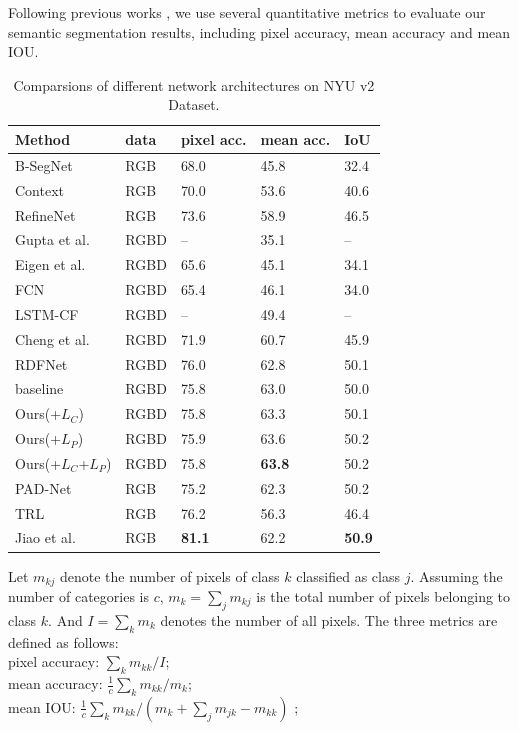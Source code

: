 Following previous works
\cite{Eigen2015,Gupta2014,Kendall2015,Lin2016,Lin2017,Li2016,Cheng2017,Park2017,Xu2018,Zhang2018,Jiao2018}, we use several quantitative metrics to evaluate our semantic segmentation results, including pixel 
accuracy, mean accuracy and mean IOU. 
%
\begin{table}[!htbp]
	\vspace{-0.4cm}
	\centering
	\caption{Comparsions of different network architectures on NYU v2 Dataset.}
	\begin{tabular*}{8.7cm}{lllll}
		\hline
		Method & data & pixel acc. & mean acc. & IoU\\
		\hline \hline
		B-SegNet \cite{Kendall2015} & RGB &68.0 & 45.8 & 32.4 \\
		Context \cite{Lin2016} & RGB & 70.0 & 53.6 & 40.6 \\
		RefineNet \cite{Lin2017} & RGB & 73.6 & 58.9 & 46.5\\
		\hline
		Gupta et al. \cite{Gupta2014} & RGBD & -- & 35.1 &--\\
		Eigen et al. \cite{Eigen2015} & RGBD & 65.6 & 45.1 & 34.1\\
		FCN \cite{Long2015} & RGBD & 65.4 & 46.1 & 34.0 \\
		LSTM-CF \cite{Li2016} & RGBD & --& 49.4 & -- \\
		Cheng et al.\cite{Cheng2017} & RGBD & 71.9 & 60.7 & 45.9 \\
		RDFNet \cite{Park2017} & RGBD & 76.0 & 62.8 & 50.1\\	
		\hline
		baseline &RGBD & 75.8 & 63.0 & 50.0\\
		Ours(+$L_C$) & RGBD & 75.8 & 63.3 & 50.1\\
		Ours(+$L_{P}$) & RGBD & 75.9 & 63.6 & 50.2\\
		Ours(+$L_{C}$+$L_{P}$)& RGBD & 75.8 & \bf{63.8} & 50.2\\
		\hline
		PAD-Net \cite{Xu2018} & RGB &75.2 & 62.3 & 50.2\\
		TRL \cite{Zhang2018} & RGB &76.2 & 56.3 & 46.4\\
		Jiao et al.\cite{Jiao2018} & RGB & \bf{81.1} & 62.2 & \bf{50.9}\\
		\hline		 		
	\end{tabular*}
	\label{Tab:Results}
\end{table}
%
Let $m_{kj}$ denote the number of pixels of class ${k}$ classified as class ${j}$.
%
Assuming the number of categories is $c$, $m_{k} = \sum_{j}m_{kj}$ is the total number of pixels belonging to class $k$. 
%
And $I = \sum_{k}m_{k}$ denotes the number of all pixels.
%
The three metrics are defined as follows:\\
\renewcommand{\baselinestretch}{1.0}\indent\text{---} pixel accuracy: $\sum_{k}m_{kk}/I$;\\
\indent\text{---} mean accuracy: $\frac{1}{c}\sum_{k}m_{kk}/m_{k}$;\\
\indent\text{---} mean IOU: $\frac{1}{c}\sum_{k}m_{kk}/(m_{k}+\sum_{j}m_{jk}-m_{kk})$ ;\\


